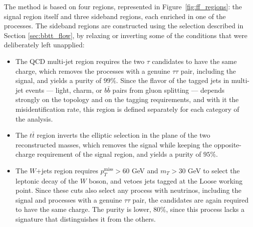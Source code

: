 The method is based on four regions, represented in Figure~\ref{fig:ff_regions}: the signal region itself and three sideband regions, each enriched in one of the processes. The sideband regions are constructed using the selection described in Section \ref{sec:bbtt_flow}, by relaxing or inverting some of the conditions that were deliberately left unapplied:
%
\begin{itemize}
    \item The QCD multi-jet region requires the two $\tau$ candidates to have the same charge, which removes the processes with a genuine $\tau\tau$ pair, including the signal, and yields a purity of $99\%$. Since the flavor of the tagged jets in multi-jet events — light, charm, or $b\bar{b}$ pairs from gluon splitting — depends strongly on the topology and on the tagging requirements, and with it the misidentification rate, this region is defined separately for each category of the analysis.
    \item The $t\bar{t}$ region inverts the elliptic selection in the plane of the two reconstructed masses, which removes the signal while keeping the opposite-charge requirement of the signal region, and yields a purity of $95\%$.
    \item The $W$+jets region requires $p_T^\text{miss} > 60$ GeV and $m_T > 30$ GeV to select the leptonic decay of the $W$ boson, and vetoes jets tagged at the Loose working point. Since these cuts also select any process with neutrinos, including the signal and processes with a genuine $\tau\tau$ pair, the candidates are again required to have the same charge. The purity is lower, $80\%$, since this process lacks a signature that distinguishes it from the others.
\end{itemize}




